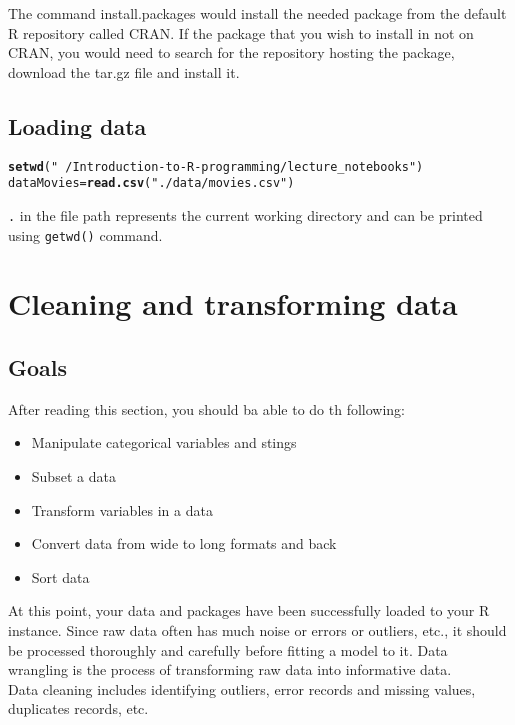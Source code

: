 \documentclass[a4paper]{article}\usepackage[]{graphicx}\usepackage[]{xcolor}
\makeatletter
\newcommand{\hlstr}[1]{\textcolor[rgb]{0.192,0.494,0.8}{#1}}%
\newcommand{\hlstd}[1]{\textcolor[rgb]{0.345,0.345,0.345}{#1}}%
\newcommand{\hlkwb}[1]{\textcolor[rgb]{0.69,0.353,0.396}{#1}}%
\newcommand{\hlkwd}[1]{\textcolor[rgb]{0.737,0.353,0.396}{\textbf{#1}}}%
\newenvironment{kframe}{%
 \def\at@end@of@kframe{}%
 \ifinner\ifhmode%
  \def\at@end@of@kframe{\end{minipage}}%
  \begin{minipage}{\columnwidth}%
 \fi\fi%
 \def\FrameCommand##1{\hskip\@totalleftmargin \hskip-\fboxsep
 \colorbox{shadecolor}{##1}\hskip-\fboxsep
     \hskip-\linewidth \hskip-\@totalleftmargin \hskip\columnwidth}%
 \MakeFramed {\advance\hsize-\width
   \@totalleftmargin\z@ \linewidth\hsize
   \@setminipage}}%
 {\par\unskip\endMakeFramed%
 \at@end@of@kframe}
\newenvironment{knitrout}{}{} %
\makeatother
\begin{document}
\noindent The command install.packages would install the needed package from the default R repository called CRAN. If the package that you wish to install in not on CRAN, you would need to search for the repository hosting the package, download the tar.gz file and install it.

\subsection{Loading data}
\begin{knitrout}
\color{fgcolor}\begin{kframe}
\begin{alltt}
\hlkwd{setwd}\hlstd{(}\hlstr{"~/Introduction-to-R-programming/lecture_notebooks"}\hlstd{)}
\hlstd{dataMovies} \hlkwb{=} \hlkwd{read.csv}\hlstd{(}\hlstr{"./data/movies.csv"}\hlstd{)}
\end{alltt}
\end{kframe}
\end{knitrout}
\noindent \texttt{.} in the file path represents the current working directory and  can be printed using \texttt{getwd()} command.





\section{Cleaning and transforming data}
\subsection*{Goals}
After reading this section, you should ba able to do th following:
\begin{itemize}
\item Manipulate categorical variables and stings
\item Subset a data
\item Transform variables in a data
\item Convert data from wide to long formats and back
\item Sort data
\end{itemize} 

\noindent At this point, your data and packages have been successfully loaded to your R instance. Since raw data often has much noise or errors or outliers, etc., it should be processed thoroughly and carefully before fitting a model to it. Data wrangling is the process of transforming raw data into informative data.\\ \vspace{2em}
\noindent Data cleaning includes identifying outliers, error records and missing values, duplicates records, etc.
\end{document}

